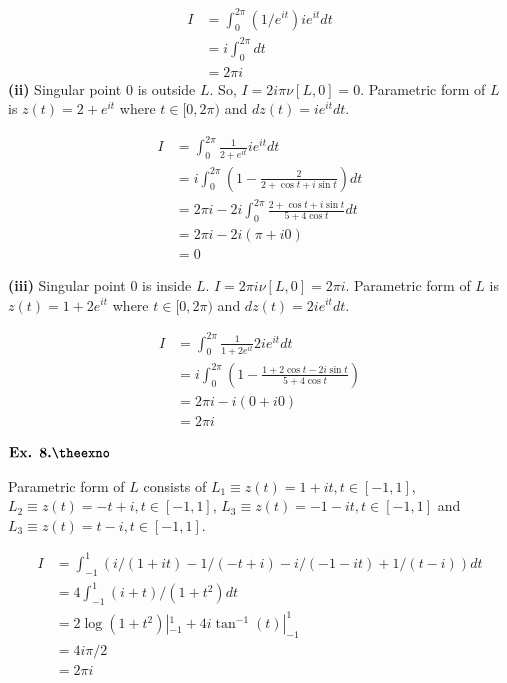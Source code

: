 \documentclass{article}
\def\tf{\textbf}
\newcounter{exno}
\begin{document}
\begin{align*}
    I &= \int_{0}^{2\pi}(1/e^{it})ie^{it}dt\\
    &= i\int_{0}^{2\pi}dt\\
    &= 2\pi i
\end{align*}
\tf{(ii)} Singular point $0$ is outside $L$. So, $I=2i\pi\nu[L,0] = 0$. Parametric form of $L$ is $z(t) = 2+e^{it}$ where $t \in [0,2\pi)$ and $dz(t) = ie^{it}dt$.

\begin{align*}
    I &= \int_{0}^{2\pi}\frac{1}{2+e^{it}}ie^{it}dt\\
    &= i\int_{0}^{2\pi}\left(1-\frac{2}{2+\cos t + i\sin t}\right)dt\\
    &= 2\pi i -2i \int_{0}^{2\pi}\frac{2+\cos t + i\sin t}{5+4\cos t}dt\\
    &= 2\pi i - 2i(\pi + i0)\\
    &= 0
\end{align*}

\tf{(iii)} Singular point $0$ is inside $L$. $I=2\pi i\nu[L,0] = 2\pi i$. Parametric form of $L$ is $z(t) = 1+2e^{it}$ where $t \in [0,2\pi)$ and $dz(t) = 2ie^{it}dt$.

\begin{align*}
    I &= \int_{0}^{2\pi}\frac{1}{1+2e^{it}}2ie^{it}dt\\
    &= i\int_{0}^{2\pi}\left(1-\frac{1+2\cos t - 2i\sin t}{5 + 4\cos t}\right)\\
    &= 2\pi i - i(0 + i0)\\
    &= 2\pi i
\end{align*}

\vspace{0.2in}

${\textbf{Ex. 8.\theexno}}$\addtocounter{exno}{1}
Parametric form of $L$ consists of $L_1 \equiv z(t) = 1+it, t\in [-1,1]$, $L_2 \equiv z(t) = -t+i, t \in [-1,1]$, $L_3 \equiv z(t) = -1-it, t\in [-1,1]$ and $L_3 \equiv z(t) = t - i, t\in [-1,1]$.

\begin{align*}
    I &= \int_{-1}^{1}(i/(1+it) - 1/(-t+i) -i/(-1-it) + 1/(t-i))dt\\
    &= 4\int_{-1}^{1}(i+t)/(1+t^2)dt\\
    &= 2\log(1+t^2)|_{-1}^{1} + 4i\tan^{-1}(t)|_{-1}^{1}\\
    &= 4i\pi/2\\
    &= 2\pi i
\end{align*}
\end{document}
